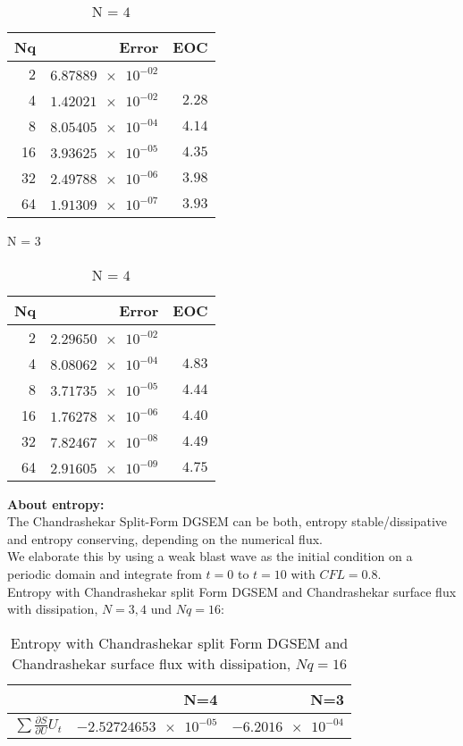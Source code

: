 \documentclass[11pt]{scrartcl}
\begin{document}
\begin{table}[H]
\parbox{.45\linewidth}{
\centering
    \begin{tabular}{|r|r|r|}
    \hline\hline
    \textbf{Nq} & \textbf{Error} & \textbf{EOC} \\\hline
    2 & $\num{6.87889e-02}$ & \\
    4 & $\num{1.42021e-02}$ & $\num{2.28}$ \\
    8 & $\num{8.05405e-04}$ & $\num{4.14}$ \\
    16 & $\num{3.93625e-05}$ & $\num{4.35}$ \\
    32 & $\num{2.49788e-06}$ & $\num{3.98}$ \\
    64 & $\num{1.91309e-07}$ & $\num{3.93}$ \\\hline\hline
  \end{tabular} 
  \caption{N = $3$}
  }
  \parbox{.45\linewidth}{
	\centering
    \begin{tabular}{|r|r|r|}
    \hline\hline
    \textbf{Nq} & \textbf{Error} & \textbf{EOC} \\\hline
    2 & $\num{2.29650e-02}$ &  \\
    4 & $\num{8.08062e-04}$ & $\num{4.83}$ \\
    8 & $\num{3.71735e-05}$ & $\num{4.44}$ \\
    16 & $\num{1.76278e-06}$ & $\num{4.40}$ \\
    32 & $\num{7.82467e-08}$ & $\num{4.49}$ \\
    64 & $\num{2.91605e-09}$ & $\num{4.75}$ \\\hline\hline
  \end{tabular}
   \caption{N = $4$}
  }
\end{table}
\textbf{About entropy:} \\
The Chandrashekar Split-Form DGSEM can be both, entropy stable/dissipative and entropy conserving, depending on the numerical flux. \\
We elaborate this by using a weak blast wave as the initial condition on a periodic domain and integrate from $t=0$ to $t=10$ with $CFL=0.8$. \\
Entropy with Chandrashekar split Form DGSEM and Chandrashekar surface flux with dissipation, $N=3, 4$ und $Nq = 16$: 
\begin{table}[H]
\centering
\begin{tabular}{|r|r|r|}
    \hline\hline
     & \textbf{N=4} & \textbf{N=3} \\\hline
    $\sum \frac{\partial S}{\partial U} U_t$ & $\num{-2.52724653e-05}$ & $\num{-6.2016e-04}$ \\\hline\hline
\end{tabular}
\caption{Entropy with Chandrashekar split Form DGSEM and Chandrashekar surface flux with dissipation, $Nq = 16$}
\end{table}
\end{document}
